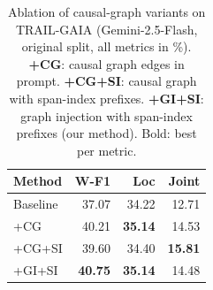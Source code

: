\begin{table}[t]
\caption{%
  Main results on TRAIL-GAIA and TRAIL-SWE-Bench.
  \textbf{W-F1}: weighted category F1.
  \textbf{Loc}: average location accuracy.
  \textbf{Joint}: location-category joint accuracy (all in \%).
  \textbf{+GI+SI}: causal graph injection with span-index prefixes (our method).
  Bold: improvement over the model's own baseline.
  $^{\dagger}$Uses the deduplicated split (\texttt{GAIA\_dedup} /
  \texttt{SWE\_Bench\_dedup}); no SWE Bench run for GPT and Gemma models.
  $^{\ddagger}$QwenLong uses \texttt{GAIA\_dedup} with context-compressed traces;
  SWE uses \texttt{SWE\_Bench\_dedup} with full traces.
  \text{---}: experiment not run.%
}
\label{tab:main_results}
\end{table}



\begin{table}[t]
\centering
\small
\setlength{\tabcolsep}{6pt}
\renewcommand{\arraystretch}{1.2}
\begin{tabular}{l rrr}
\toprule
\textbf{Method} & \textbf{W-F1} & \textbf{Loc} & \textbf{Joint} \\
\midrule
Baseline         & 37.07 & 34.22 & 12.71 \\
+CG              & 40.21 & \textbf{35.14} & 14.53 \\
+CG+SI           & 39.60 & 34.40 & \textbf{15.81} \\
+GI+SI           & \textbf{40.75} & \textbf{35.14} & 14.48 \\
\bottomrule
\end{tabular}
\caption{%
  Ablation of causal-graph variants on TRAIL-GAIA
  (Gemini-2.5-Flash, original split, all metrics in \%).
  \textbf{+CG}: causal graph edges in prompt.
  \textbf{+CG+SI}: causal graph with span-index prefixes.
  \textbf{+GI+SI}: graph injection with span-index prefixes (our method).
  Bold: best per metric.%
}
\label{tab:ablation_methods}
\end{table}




